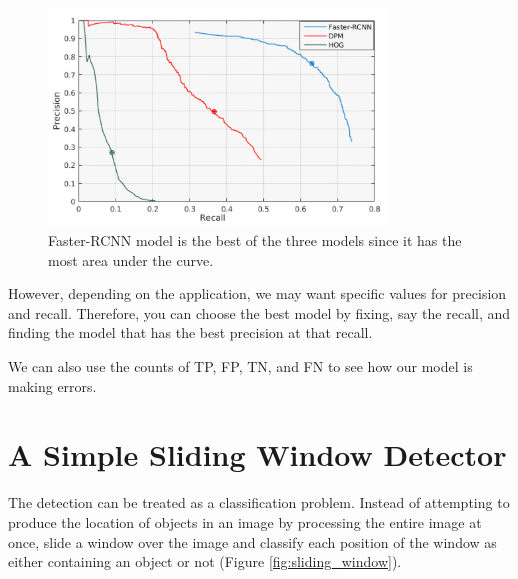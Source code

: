 \documentclass{article}
\begin{document}
\begin{figure}[ht]
\centering
	\includegraphics[width=0.8\textwidth]{precision_recall.jpg}
    \caption{Faster-RCNN model is the best of the three models since it has the most area under the curve.}
\end{figure}

However, depending on the application, we may want specific values for precision and recall. Therefore, you can choose the best model by fixing, say the recall, and finding the model that has the best precision at that recall.

We can also use the counts of TP, FP, TN, and FN to see how our model is making errors.


\section{A Simple Sliding Window Detector}
The detection can be treated as a classification problem. Instead of attempting to produce the location of objects in an image by processing the entire image at once, slide a window over the image and classify each position of the window as either containing an object or not (Figure \ref{fig:sliding_window}).
\end{document}
